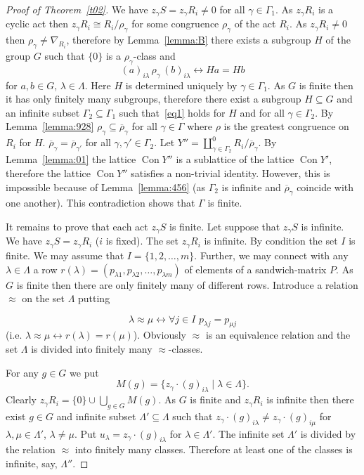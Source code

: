 \documentclass{birkau}
\numberwithin{equation}{section}
\theoremstyle{plain}
\theoremstyle{definition}
\DeclareMathOperator{\Con}{Con}
\begin{document}
\begin{proof}[Proof of Theorem~\ref{t02}]
        We have $z_\gamma S = z_\gamma R_i \ne 0$ for all $\gamma \in \Gamma_1$. As $z_\gamma R_i$ is a cyclic act then $z_\gamma R_i \cong R_i/\rho_\gamma$ for some congruence $\rho_\gamma$ of the act $R_i$. As $z_\gamma R_i \ne 0$ then $\rho_\gamma \ne \nabla_{R_i}$, therefore by Lemma~\ref{lemma:B} there exists a subgroup $H$ of the group $G$ such that $\{ 0 \}$ is a $\rho_\gamma$-class and
        $$ (a)_{i\lambda}\, \rho_\gamma \, (b)_{i\lambda} \leftrightarrow Ha=Hb  $$
        for $a,b\in G$, $\lambda \in \Lambda$. Here $H$ is determined uniquely by $\gamma \in \Gamma_1$. As $G$ is finite then it has only finitely many subgroups, therefore there exist a subgroup $H \subseteq G$ and an infinite subset $\Gamma_2 \subseteq \Gamma_1$ such that~\eqref{eq1} holds for $H$ and for all $\gamma \in \Gamma_2$. By Lemma~\ref{lemma:928} $\rho_\gamma \subseteq \overline \rho_\gamma$ for all $\gamma \in \Gamma$ where $\rho$ is the greatest congruence on $R_i$ for $H$. $\overline \rho_\gamma = \overline\rho_{\gamma'}$ for all $\gamma, \gamma' \in \Gamma_2$. Let $Y''= \coprod_{\gamma \in \Gamma_2}^0 R_i/{\overline \rho_\gamma}$. By Lemma~\ref{lemma:01} the lattice $\Con Y''$ is a sublattice of the lattice $\Con Y'$, therefore the lattice $\Con Y''$ satisfies a non-trivial identity. However, this is impossible because of Lemma~\ref{lemma:456} (as $\Gamma_2$ is infinite and $\overline\rho_\gamma$ coincide with one another). This contradiction shows that $\Gamma$ is finite.

        It remains to prove that each act $z_\gamma S$ is finite. Let suppose that $z_\gamma S$ is infinite. We have $z_\gamma S = z_\gamma R_i$ ($i$ is fixed). The set $z_\gamma R_i$ is infinite. By condition the set $I$ is finite. We may assume that $I=\{ 1,2, \ldots, m\}$. Further, we may connect with any $\lambda \in \Lambda$ a row $r(\lambda) = (p_{\lambda 1}, p_{\lambda 2}, \ldots, p_{\lambda m})$ of elements of a sandwich-matrix $P$. As $G$ is finite then there are only finitely many of different rows. Introduce a relation $\approx$ on the set $\Lambda$ putting

        $$ \lambda \approx \mu \leftrightarrow \forall j\in I \,\, p_{\lambda j} = p_{\mu j} $$
        (i.e. $\lambda \approx \mu \leftrightarrow r(\lambda) = r(\mu)$). Obviously $\approx$ is an equivalence relation and the set $\Lambda$ is divided into finitely many ${\approx}$-classes.

        For any $g \in G$ we put $$ M(g)= \{ z_\gamma \cdot (g)_{i\lambda} \mid \lambda \in \Lambda \}.  $$ Clearly $z_\gamma R_i = \{0\} \cup \bigcup_{g\in G} M(g)$. As $G$ is finite and $z_\gamma R_i$ is infinite then there exist $g\in G$ and infinite subset $\Lambda' \subseteq \Lambda$ such that $z_\gamma \cdot (g)_{ i \lambda } \ne z_\gamma \cdot (g)_{ i \mu}$ for $\lambda, \mu \in \Lambda'$, $\lambda \ne \mu$. Put $u_\lambda=z_\gamma \cdot (g)_{i\lambda}$ for $\lambda \in \Lambda'$. The infinite set $\Lambda'$ is divided by the relation $\approx$ into finitely many classes. Therefore at least one of the classes is infinite, say, $\Lambda''$.


\end{proof}
\end{document}
